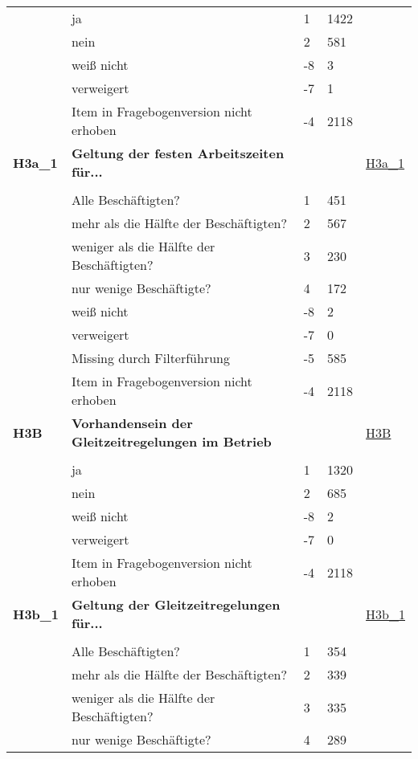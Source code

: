 \begin{longtable}{| L{2.5cm} | L{8.25cm}| C{1.5cm} | R{1.25cm} | C{2.25cm} |  }
   & ja & 1 & 1422 &  \\ 
   & nein & 2 & 581 &  \\ 
   & weiß nicht & -8 & 3 &  \\ 
   & verweigert & -7 & 1 &  \\ 
   & Item in Fragebogenversion nicht erhoben & -4 & 2118 &  \\ 
   \midrule
\textbf{H3a\_1}\label{var:suf:H3a:1} & \textbf{Geltung der festen Arbeitszeiten für...} &  &  & \hyperref[H3a:1]{H3a\_1} \\ 
   &  &  &  &  \\ 
   & Alle Beschäftigten? & 1 & 451 &  \\ 
   & mehr als die Hälfte der Beschäftigten? & 2 & 567 &  \\ 
   & weniger als die Hälfte der Beschäftigten? & 3 & 230 &  \\ 
   & nur wenige Beschäftigte? & 4 & 172 &  \\ 
   & weiß nicht & -8 & 2 &  \\ 
   & verweigert & -7 & 0 &  \\ 
   & Missing durch Filterführung & -5 & 585 &  \\ 
   & Item in Fragebogenversion nicht erhoben & -4 & 2118 &  \\ 
   \midrule
\textbf{H3B}\label{var:suf:H3B} & \textbf{Vorhandensein der Gleitzeitregelungen im Betrieb} &  &  & \hyperref[H3B]{H3B} \\ 
   &  &  &  &  \\ 
   & ja & 1 & 1320 &  \\ 
   & nein & 2 & 685 &  \\ 
   & weiß nicht & -8 & 2 &  \\ 
   & verweigert & -7 & 0 &  \\ 
   & Item in Fragebogenversion nicht erhoben & -4 & 2118 &  \\ 
   \midrule
\textbf{H3b\_1}\label{var:suf:H3b:1} & \textbf{Geltung der Gleitzeitregelungen für...} &  &  & \hyperref[H3b:1]{H3b\_1} \\ 
   &  &  &  &  \\ 
   & Alle Beschäftigten? & 1 & 354 &  \\ 
   & mehr als die Hälfte der Beschäftigten? & 2 & 339 &  \\ 
   & weniger als die Hälfte der Beschäftigten? & 3 & 335 &  \\ 
   & nur wenige Beschäftigte? & 4 & 289 &  \\ 

\end{longtable}
